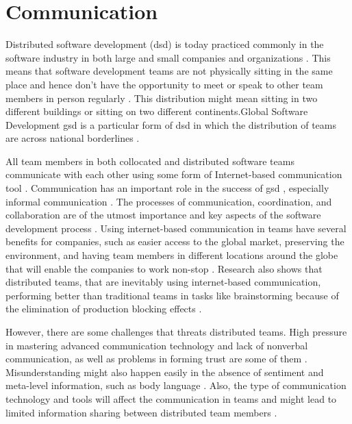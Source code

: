 \chapter{Communication}
Distributed software development (\ac{dsd}) is today practiced commonly in the software industry in both large and small companies and organizations \citep{shrivastava2010distributed}. This means that software development teams are not physically sitting in the same place and hence don’t have the opportunity to meet or speak to other team members in person regularly \citep{layman2006essential}. This distribution might mean sitting in two different buildings or sitting on two different continents.Global Software Development \ac{gsd} is a particular form of \ac{dsd} in which the distribution of teams are across national borderlines \citep{sahay2003global}. 

All team members in both collocated and distributed software teams communicate with each other using some form of Internet-based communication tool \citep{Kirkman2005}. Communication has an important role in the success of \ac{gsd} \citep{carmel2001tactical,french1998study}, especially informal communication \citep{herbsleb2003empirical}. The processes of communication, coordination, and collaboration are of the utmost importance and key aspects of the software development process \citep{colomo2014agile}. Using internet-based communication in teams have several benefits for companies, such as easier access to the global market, preserving the environment, and having team members in different locations around the globe that will enable the companies to work non-stop \citep{Cascio2000}. Research also shows that distributed teams, that are inevitably using internet-based communication, performing better than traditional teams in tasks like brainstorming because of the elimination of production blocking effects \citep{Espinosa2015}.

However, there are some challenges that threats distributed teams. High pressure in mastering advanced communication technology and lack of nonverbal communication, as well as problems in forming trust are some of them \citep{Jarvenpaa1998,Kayworth2002}. Misunderstanding might also happen easily in the absence of sentiment and meta-level information, such as body language \citep{Cramton2001}. Also, the type of communication technology and tools will affect the communication in teams and might lead to limited information sharing between distributed team members \citep{Gilson2015}.

